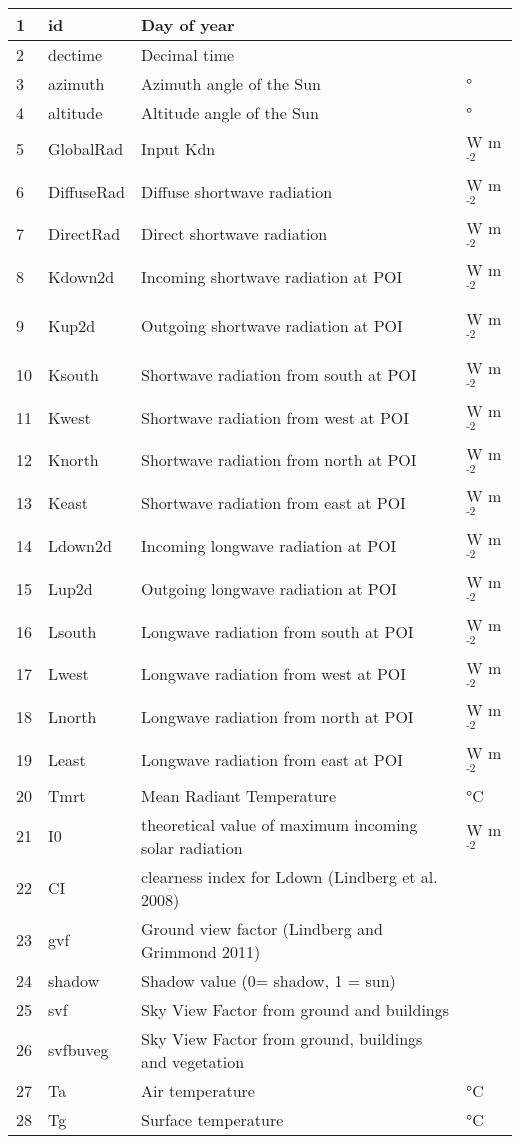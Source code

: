 \documentclass[letterpaper,10pt,english]{sphinxmanual}
\begin{document}
\begin{savenotes}
\begin{longtable}{|l|l|l|l|}
1
&
id
&
Day of year
&\\
\hline
2
&
dectime
&
Decimal time
&\\
\hline
3
&
azimuth
&
Azimuth angle
of the Sun
&
°
\\
\hline
4
&
altitude
&
Altitude angle
of the Sun
&
°
\\
\hline
5
&
GlobalRad
&
Input Kdn
&
W m$^{\text{-2}}$
\\
\hline
6
&
DiffuseRad
&
Diffuse
shortwave
radiation
&
W m$^{\text{-2}}$
\\
\hline
7
&
DirectRad
&
Direct
shortwave
radiation
&
W m$^{\text{-2}}$
\\
\hline
8
&
Kdown2d
&
Incoming
shortwave
radiation at
POI
&
W m$^{\text{-2}}$
\\
\hline&&&\\
\hline
9
&
Kup2d
&
Outgoing
shortwave
radiation at
POI
&
W m$^{\text{-2}}$
\\
\hline&&&\\
\hline
10
&
Ksouth
&
Shortwave
radiation from
south at POI
&
W m$^{\text{-2}}$
\\
\hline
11
&
Kwest
&
Shortwave
radiation from
west at POI
&
W m$^{\text{-2}}$
\\
\hline
12
&
Knorth
&
Shortwave
radiation from
north at POI
&
W m$^{\text{-2}}$
\\
\hline
13
&
Keast
&
Shortwave
radiation from
east at POI
&
W m$^{\text{-2}}$
\\
\hline
14
&
Ldown2d
&
Incoming
longwave
radiation at
POI
&
W m$^{\text{-2}}$
\\
\hline
15
&
Lup2d
&
Outgoing
longwave
radiation at
POI
&
W m$^{\text{-2}}$
\\
\hline
16
&
Lsouth
&
Longwave
radiation from
south at POI
&
W m$^{\text{-2}}$
\\
\hline
17
&
Lwest
&
Longwave
radiation from
west at POI
&
W m$^{\text{-2}}$
\\
\hline
18
&
Lnorth
&
Longwave
radiation from
north at POI
&
W m$^{\text{-2}}$
\\
\hline
19
&
Least
&
Longwave
radiation from
east at POI
&
W m$^{\text{-2}}$
\\
\hline
20
&
Tmrt
&
Mean Radiant
Temperature
&
°C
\\
\hline
21
&
I0
&
theoretical
value of
maximum
incoming solar
radiation
&
W m$^{\text{-2}}$
\\
\hline
22
&
CI
&
clearness index
for Ldown
(Lindberg et
al. 2008)
&\\
\hline
23
&
gvf
&
Ground view
factor
(Lindberg and
Grimmond 2011)
&\\
\hline
24
&
shadow
&
Shadow value
(0= shadow, 1 =
sun)
&\\
\hline
25
&
svf
&
Sky View Factor
from ground and
buildings
&\\
\hline
26
&
svfbuveg
&
Sky View Factor
from ground,
buildings and
vegetation
&\\
\hline
27
&
Ta
&
Air temperature
&
°C
\\
\hline
28
&
Tg
&
Surface
temperature
&
°C
\\
\hline
\end{longtable}\sphinxatlongtableend\end{savenotes}
\end{document}
